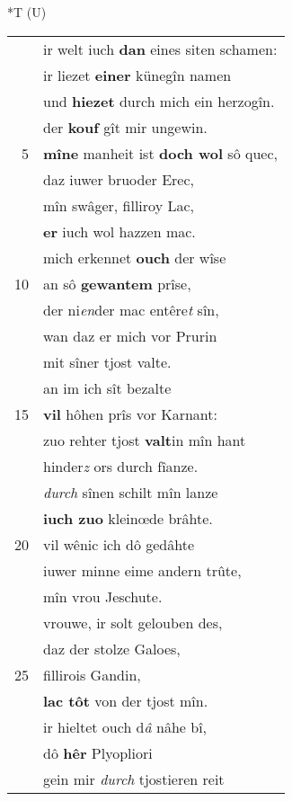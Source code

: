 \documentclass[8pt,a4paper,notitlepage]{article}
\begin{document}
\begin{table}[ht]
\begin{minipage}[t]{0.5\linewidth}
\end{minipage}
\hspace{0.5cm}
\begin{minipage}[t]{0.5\linewidth}
\small
\begin{center}*T (U)
\end{center}
\begin{tabular}{rl}
 & ir welt iuch \textbf{dan} eines siten schamen:\\ 
 & ir liezet \textbf{einer} künegîn namen\\ 
 & und \textbf{hiezet} durch mich ein herzogîn.\\ 
 & der \textbf{kouf} gît mir ungewin.\\ 
5 & \textbf{mîne} manheit ist \textbf{doch wol} sô quec,\\ 
 & daz iuwer bruoder Erec,\\ 
 & mîn swâger, filliroy Lac,\\ 
 & \textbf{er} iuch wol hazzen mac.\\ 
 & mich erkennet \textbf{ouch} der wîse\\ 
10 & an sô \textbf{gewantem} prîse,\\ 
 & der ni\textit{en}der mac entêre\textit{t} sîn,\\ 
 & wan daz er mich vor Prurin\\ 
 & mit sîner tjost valte.\\ 
 & an im ich sît bezalte\\ 
15 & \textbf{vil} hôhen prîs vor Karnant:\\ 
 & zuo rehter tjost \textbf{valt}in mîn hant\\ 
 & hinder\textit{z} ors durch fîanze.\\ 
 & \textit{durch} sînen schilt mîn lanze\\ 
 & \textbf{iuch zuo} kleinœde brâhte.\\ 
20 & vil wênic ich dô gedâhte\\ 
 & iuwer minne eime andern trûte,\\ 
 & mîn vrou Jeschute.\\ 
 & vrouwe, ir solt gelouben des,\\ 
 & daz der stolze Galoes,\\ 
25 & fillirois Gandin,\\ 
 & \textbf{lac tôt} von der tjost mîn.\\ 
 & ir hieltet ouch d\textit{â} nâhe bî,\\ 
 & dô \textbf{hêr} Plyopliori\\ 
 & gein mir \textit{durch} tjostieren reit\\ 

\end{tabular}
\end{minipage}
\end{table}
\end{document}
